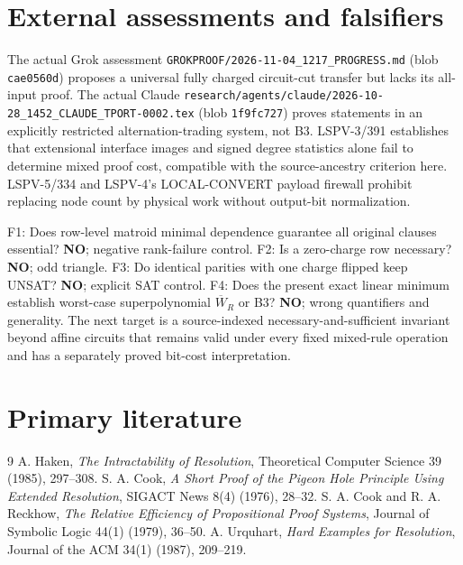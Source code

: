 \documentclass[11pt]{article}
\begin{document}
\section*{External assessments and falsifiers}
The actual Grok assessment \texttt{GROKPROOF/2026-11-04\_1217\_PROGRESS.md} (blob \texttt{cae0560d}) proposes a universal fully charged circuit-cut transfer but lacks its all-input proof. The actual Claude \texttt{research/agents/claude/2026-10-28\_1452\_CLAUDE\_TPORT-0002.tex} (blob \texttt{1f9fc727}) proves statements in an explicitly restricted alternation-trading system, not B3. LSPV-3/391 establishes that extensional interface images and signed degree statistics alone fail to determine mixed proof cost, compatible with the source-ancestry criterion here. LSPV-5/334 and LSPV-4's LOCAL-CONVERT payload firewall prohibit replacing node count by physical work without output-bit normalization.

F1: Does row-level matroid minimal dependence guarantee all original clauses essential? \textbf{NO}; negative rank-failure control. F2: Is a zero-charge row necessary? \textbf{NO}; odd triangle. F3: Do identical parities with one charge flipped keep UNSAT? \textbf{NO}; explicit SAT control. F4: Does the present exact linear minimum establish worst-case superpolynomial $\overline W_R$ or B3? \textbf{NO}; wrong quantifiers and generality. The next target is a source-indexed necessary-and-sufficient invariant beyond affine circuits that remains valid under every fixed mixed-rule operation and has a separately proved bit-cost interpretation.

\section*{Primary literature}
\begin{thebibliography}{9}
 A. Haken, \emph{The Intractability of Resolution}, Theoretical Computer Science 39 (1985), 297--308.
 S. A. Cook, \emph{A Short Proof of the Pigeon Hole Principle Using Extended Resolution}, SIGACT News 8(4) (1976), 28--32.
 S. A. Cook and R. A. Reckhow, \emph{The Relative Efficiency of Propositional Proof Systems}, Journal of Symbolic Logic 44(1) (1979), 36--50.
 A. Urquhart, \emph{Hard Examples for Resolution}, Journal of the ACM 34(1) (1987), 209--219.
\end{thebibliography}
\end{document}
